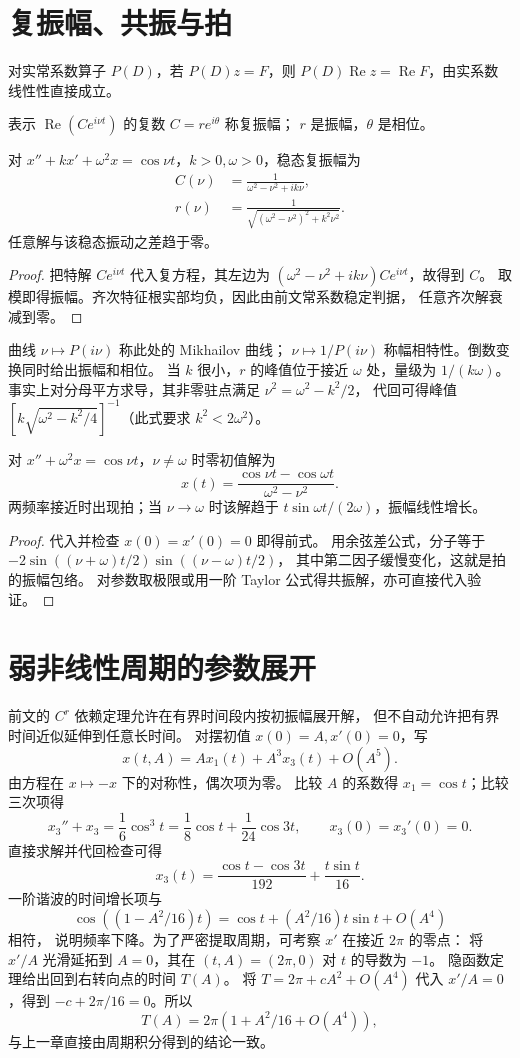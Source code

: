 \section{复振幅、共振与拍}
对实常系数算子 $P(D)$，若 $P(D)z=F$，则
$P(D)\operatorname{Re}z=\operatorname{Re}F$，由实系数线性性直接成立。
\begin{definition}
表示 $\operatorname{Re}(Ce^{i\nu t})$ 的复数 $C=re^{i\theta}$ 称复振幅；
$r$ 是振幅，$\theta$ 是相位。
\end{definition}
\begin{proposition}
对 $x''+kx'+\omega^2x=\cos\nu t$，$k>0,\omega>0$，稳态复振幅为
\[
 \begin{aligned}
 C(\nu)&=\frac1{\omega^2-\nu^2+ik\nu},\\
 r(\nu)&=\frac1{\sqrt{(\omega^2-\nu^2)^2+k^2\nu^2}}.
\end{aligned}
\]
任意解与该稳态振动之差趋于零。
\end{proposition}
\begin{proof}
把特解 $Ce^{i\nu t}$ 代入复方程，其左边为
$(\omega^2-\nu^2+ik\nu)Ce^{i\nu t}$，故得到 $C$。
取模即得振幅。齐次特征根实部均负，因此由前文常系数稳定判据，
任意齐次解衰减到零。
\end{proof}
曲线 $\nu\mapsto P(i\nu)$ 称此处的 Mikhailov 曲线；
$\nu\mapsto1/P(i\nu)$ 称幅相特性。倒数变换同时给出振幅和相位。
当 $k$ 很小，$r$ 的峰值位于接近 $\omega$ 处，量级为 $1/(k\omega)$。
事实上对分母平方求导，其非零驻点满足 $\nu^2=\omega^2-k^2/2$，
代回可得峰值 $[k\sqrt{\omega^2-k^2/4}]^{-1}$（此式要求 $k^2<2\omega^2$）。

\begin{proposition}[无阻尼极限]
对 $x''+\omega^2x=\cos\nu t$，$\nu\ne\omega$ 时零初值解为
\[
 x(t)=\frac{\cos\nu t-\cos\omega t}{\omega^2-\nu^2}.
\]
两频率接近时出现拍；当 $\nu\to\omega$ 时该解趋于
$t\sin\omega t/(2\omega)$，振幅线性增长。
\end{proposition}
\begin{proof}
代入并检查 $x(0)=x'(0)=0$ 即得前式。
用余弦差公式，分子等于
$-2\sin((\nu+\omega)t/2)\sin((\nu-\omega)t/2)$，
其中第二因子缓慢变化，这就是拍的振幅包络。
对参数取极限或用一阶 Taylor 公式得共振解，亦可直接代入验证。
\end{proof}

\section{弱非线性周期的参数展开}
前文的 $C^r$ 依赖定理允许在有界时间段内按初振幅展开解，
但不自动允许把有界时间近似延伸到任意长时间。
对摆初值 $x(0)=A,x'(0)=0$，写
\[
 x(t,A)=A x_1(t)+A^3x_3(t)+O(A^5).
\]
由方程在 $x\mapsto-x$ 下的对称性，偶次项为零。
比较 $A$ 的系数得 $x_1=\cos t$；比较三次项得
\[
 x_3''+x_3=\frac16\cos^3t
 =\frac18\cos t+\frac1{24}\cos3t,
 \qquad x_3(0)=x_3'(0)=0.
\]
直接求解并代回检查可得
\[
 x_3(t)=\frac{\cos t-\cos3t}{192}+\frac{t\sin t}{16}.
\]
一阶谐波的时间增长项与
\[
 \cos((1-A^2/16)t)=\cos t+(A^2/16)t\sin t+O(A^4)
\]
 相符，
说明频率下降。为了严密提取周期，可考察 $x'$ 在接近 $2\pi$ 的零点：
将 $x'/A$ 光滑延拓到 $A=0$，其在 $(t,A)=(2\pi,0)$ 对 $t$ 的导数为 $-1$。
隐函数定理给出回到右转向点的时间 $T(A)$。
将 $T=2\pi+cA^2+O(A^4)$ 代入 $x'/A=0$，得到
$-c+2\pi/16=0$。所以
\[
 T(A)=2\pi(1+A^2/16+O(A^4)),
\]
与上一章直接由周期积分得到的结论一致。
